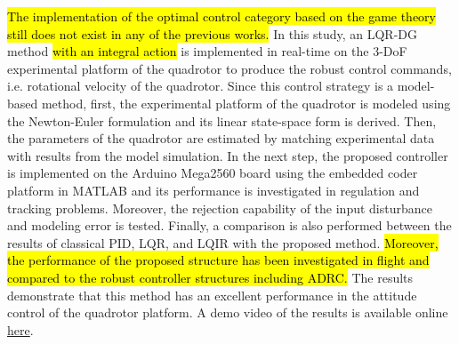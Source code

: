 \documentclass[3p]{elsarticle}
\begin{document}





\hl{The implementation of the optimal control category based on the game theory still does not exist in any of the previous works.} In this study, an LQR-DG method \hl{with an integral action} is implemented in real-time on the 3-DoF experimental platform of the quadrotor to produce the robust control commands, i.e. rotational velocity of the quadrotor. Since this control strategy is a model-based method, first, the experimental platform of the quadrotor is modeled using the Newton-Euler formulation and its linear state-space form is derived. Then, the parameters of the quadrotor are estimated by matching experimental data with results from the model simulation. In the next step, the proposed controller is implemented on the Arduino Mega2560 board using the embedded coder platform in MATLAB and its performance is investigated in regulation and tracking problems. Moreover, the rejection capability of the input disturbance and modeling error is tested. Finally, a comparison is also performed between the results of classical PID, LQR, and LQIR with the proposed method. \hl{Moreover, the performance of the proposed structure has been investigated in flight and compared to the robust controller structures including ADRC.} The results demonstrate that this method has an excellent performance in the attitude control of the quadrotor platform. A demo video of the results is available online \href{https://youtu.be/SXZACxGaE1A?si=jxF7Uxh1Ed5-WX1J}{here}.
\end{document}
